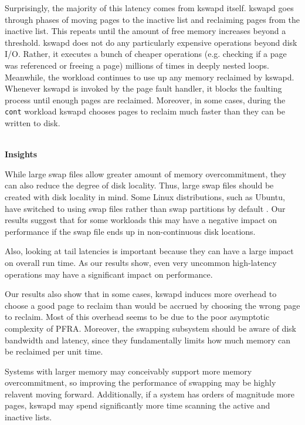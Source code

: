 \documentclass[twocolumn,11pt]{article}
\begin{document}
Surprisingly, the majority of this latency comes from kswapd itself. kswapd goes
through phases of moving pages to the inactive list and reclaiming pages from
the inactive list. This repeats until the amount of free memory increases
beyond a threshold. kswapd does not do any particularly expensive operations
beyond disk I/O. Rather, it executes a bunch of cheaper operations (e.g.
checking if a page was referenced or freeing a page) millions of times in deeply
nested loops. Meanwhile, the workload continues to use up any memory reclaimed
by kswapd. Whenever kswapd is invoked by the page fault handler, it blocks the
faulting process until enough pages are reclaimed.  Moreover, in some cases,
during the \texttt{cont} workload kswapd chooses pages to reclaim much faster
than they can be written to disk.

~\\ \textbf{Insights} 

While large swap files allow greater amount of memory overcommitment, they can
also reduce the degree of disk locality. Thus, large swap files should be
created with disk locality in mind. Some Linux distributions, such as
Ubuntu, have switched to using swap files rather than swap partitions by default
\cite{swap_ubuntu}. Our results suggest that for some workloads this may have a
negative impact on performance if the swap file ends up in non-continuous disk
locations.


Also, looking at tail latencies is important because they can have a large
impact on overall run time. As our results show, even very uncommon high-latency
operations may have a significant impact on performance.

Our results also show that in some cases, kswapd induces more overhead to choose
a good page to reclaim than would be accrued by choosing the wrong page to
reclaim. Most of this overhead seems to be due to the poor asymptotic complexity
of PFRA. Moreover, the swapping subsystem should be aware of disk bandwidth and
latency, since they fundamentally limits how much memory can be reclaimed per
unit time.

Systems with larger memory may conceivably support more memory overcommitment,
so improving the performance of swapping may be highly relavent moving forward.
Additionally, if a system has orders of magnitude more pages, kswapd may spend
significantly more time scanning the active and inactive lists.
\end{document}
